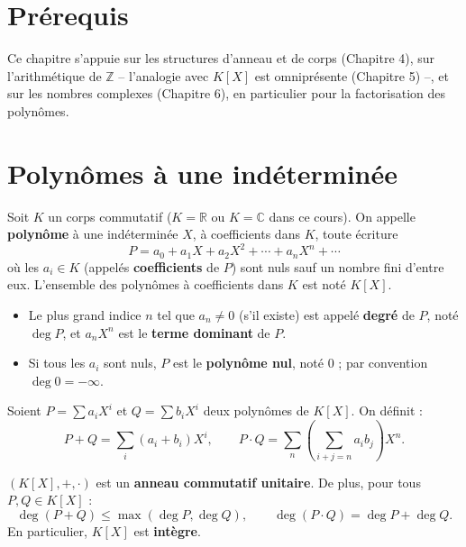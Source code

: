 \documentclass[a4paper,12pt,openany]{book}
\begin{document}
\section{Prérequis}

Ce chapitre s'appuie sur les structures d'anneau et de corps (Chapitre 4),
sur l'arithmétique de $\mathbb{Z}$ -- l'analogie avec $K[X]$ est
omniprésente (Chapitre 5) --, et sur les nombres complexes (Chapitre 6),
en particulier pour la factorisation des polynômes.

\section{Polynômes à une indéterminée}

\begin{definition}[7.1]
Soit $K$ un corps commutatif ($K=\mathbb{R}$ ou $K=\mathbb{C}$ dans ce
cours). On appelle \textbf{polynôme} à une indéterminée $X$, à
coefficients dans $K$, toute écriture
\[
P = a_0 + a_1X + a_2X^2 + \cdots + a_nX^n + \cdots
\]
où les $a_i \in K$ (appelés \textbf{coefficients} de $P$) sont nuls sauf
un nombre fini d'entre eux. L'ensemble des polynômes à coefficients dans
$K$ est noté $K[X]$.
\begin{itemize}
  \item Le plus grand indice $n$ tel que $a_n\neq0$ (s'il existe) est
  appelé \textbf{degré} de $P$, noté $\deg P$, et $a_nX^n$ est le
  \textbf{terme dominant} de $P$.
  \item Si tous les $a_i$ sont nuls, $P$ est le \textbf{polynôme nul},
  noté $0$ ; par convention $\deg 0 = -\infty$.
\end{itemize}
\end{definition}

\begin{definition}[7.2 -- Opérations]
Soient $P=\sum a_iX^i$ et $Q=\sum b_iX^i$ deux polynômes de $K[X]$. On
définit :
\[
P+Q = \sum_i (a_i+b_i)X^i, \qquad P\cdot Q = \sum_n \left(\sum_{i+j=n}
a_ib_j\right) X^n.
\]
\end{definition}

\begin{theoreme}[7.1]
$(K[X],+,\cdot)$ est un \textbf{anneau commutatif unitaire}. De plus, pour
tous $P,Q\in K[X]$ :
\[
\deg(P+Q) \leq \max(\deg P,\deg Q), \qquad \deg(P\cdot Q) = \deg P + \deg Q.
\]
En particulier, $K[X]$ est \textbf{intègre}.
\end{theoreme}
\end{document}
